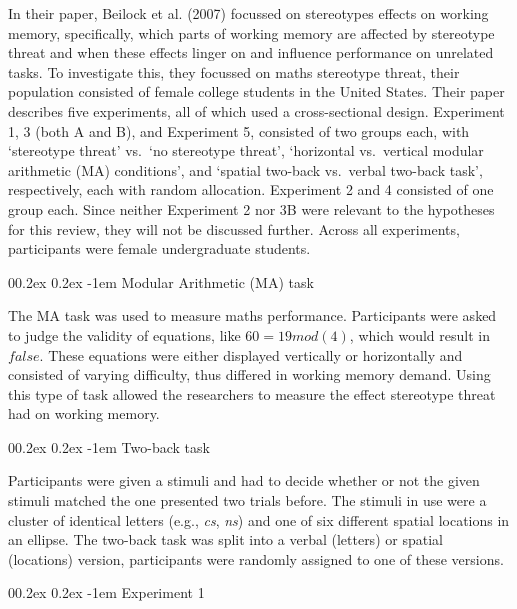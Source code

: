 \documentclass[
  stu,floatsintext]{apa7}
\makeatletter
\let\oldparagraph\paragraph
\renewcommand{\paragraph}[1]{\oldparagraph{#1}\mbox{}}
\renewcommand{\paragraph}{\@startsection{paragraph}{4}{\parindent}%
  {0\baselineskip \@plus 0.2ex \@minus 0.2ex}%
  {-1em}%
  {\normalfont\normalsize\bfseries\itshape\typesectitle}}
\renewcommand{\paragraph}{\@startsection{paragraph}{4}{\parindent}%
  {0\baselineskip \@plus 0.2ex \@minus 0.2ex}%
  {-1em}%
  {\normalfont\normalsize\bfseries\typesectitle}}
\makeatother
\begin{document}
In their paper, Beilock et al. (2007) focussed on stereotypes effects on working memory, specifically, which parts of working memory are affected by stereotype threat and when these effects linger on and influence performance on unrelated tasks.
To investigate this, they focussed on maths stereotype threat, their population consisted of female college students in the United States.
Their paper describes five experiments, all of which used a cross-sectional design.
Experiment 1, 3 (both A and B), and Experiment 5, consisted of two groups each, with `stereotype threat' vs.~`no stereotype threat', `horizontal vs.~vertical modular arithmetic (MA) conditions', and `spatial two-back vs.~verbal two-back task', respectively, each with random allocation.
Experiment 2 and 4 consisted of one group each.
Since neither Experiment 2 nor 3B were relevant to the hypotheses for this review, they will not be discussed further.
Across all experiments, participants were female undergraduate students.

\paragraph{Modular Arithmetic (MA) task}\label{modular-arithmetic-ma-task}

The MA task was used to measure maths performance.
Participants were asked to judge the validity of equations, like \(60 = 19 mod(4)\), which would result in \(false\).
These equations were either displayed vertically or horizontally and consisted of varying difficulty, thus differed in working memory demand.
Using this type of task allowed the researchers to measure the effect stereotype threat had on working memory.

\paragraph{Two-back task}\label{two-back-task}

Participants were given a stimuli and had to decide whether or not the given stimuli matched the one presented two trials before.
The stimuli in use were a cluster of identical letters (e.g., \emph{cs}, \emph{ns}) and one of six different spatial locations in an ellipse.
The two-back task was split into a verbal (letters) or spatial (locations) version, participants were randomly assigned to one of these versions.

\paragraph{Experiment 1}\label{experiment-1}
\end{document}
